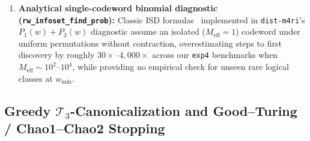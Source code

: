 \documentclass[12pt]{article}
\theoremstyle{definition}
\newcommand{\Tc}{\mathcal{T}_3}
\newcommand{\ttt}[1]{\texttt{#1}}
\begin{document}
\begin{enumerate}[label=(\arabic*)]
\begin{itemize}
        hits; with the non-wrapping window of Section~\ref{subsec:pr_regimes} neither rule stops early on
        \ttt{bb\_72\_simp}. The hybrid windows of the \ttt{dist-m4ri} binary also wrap.)
    \end{itemize}
  \item \textbf{Analytical single-codeword binomial diagnostic (\ttt{rw\_infoset\_find\_prob}):} Classic
    ISD formulas~\cite{Leon1988,CanteautChabaud1998} implemented in \ttt{dist-m4ri}'s $P_1(w) + P_2(w)$ diagnostic
    assume an isolated ($M_{\mathrm{eff}} = 1$) codeword under uniform permutations without contraction,
    overestimating steps to first discovery by roughly $30\times$--$4{,}000\times$ across our \ttt{exp4} benchmarks
    when $M_{\mathrm{eff}} \sim 10^2$--$10^4$, while providing no empirical check for unseen rare logical classes at
    $w_{\min}$.
\end{enumerate}

\subsection{Greedy \texorpdfstring{$\Tc$}{T3}-Canonicalization and Good\texorpdfstring{--}{-}Turing / Chao1--Chao2
  Stopping}\label{subsec:gt_chao_gauge}
\end{document}
